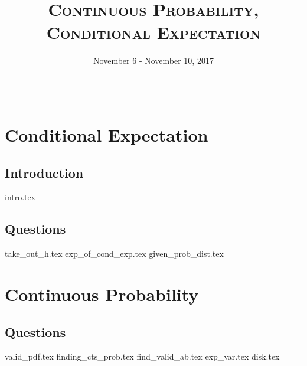 \documentclass{exam}
\title{\textsc{Continuous Probability, Conditional Expectation}}
\date{November 6 - November 10, 2017}
\begin{document}
\maketitle
\rule{\textwidth}{0.15em}
\fontsize{12}{15}\selectfont
\thispagestyle{empty}


\section{Conditional Expectation}
\subsection{Introduction}
{intro.tex}
\subsection{Questions}
\begin{questions}
{take_out_h.tex}
{exp_of_cond_exp.tex}
{given_prob_dist.tex}
\end{questions}

\section{Continuous Probability}               
                                                                                                                            
\subsection{Questions}                                                                                                                                                      
\begin{questions}                                                                                                                                                           
{valid_pdf.tex}                                                                                                    
{finding_cts_prob.tex}                                                                                             
{find_valid_ab.tex}                                                                                                {exp_var.tex}                                                                                                      
{disk.tex}
\end{questions}
                               
\end{document}
